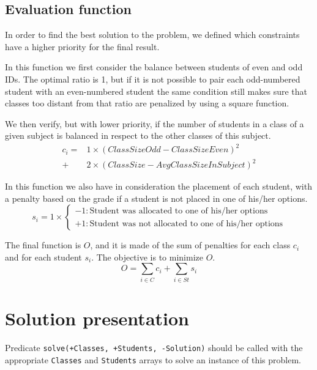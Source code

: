 \documentclass[runningheads]{llncs}
\begin{document}
\subsection{Evaluation function}

In order to find the best solution to the problem, we defined which constraints have a higher priority for the final result.

In this function we first consider the balance between students of even and odd IDs. The optimal ratio is 1, but if it is not possible to pair each odd-numbered student with an even-numbered student the same condition still makes sure that classes too distant from that ratio are penalized by using a square function. 

We then verify, but with lower priority, if the number of students in a class of a given subject is balanced in respect to the other classes of this subject.
\begin{equation}
\begin{aligned}
    c_i = & 1 \times \left(ClassSizeOdd - ClassSizeEven\right)^2 \\
        + & 2 \times \left(ClassSize - AvgClassSizeInSubject\right)^2
\end{aligned}
\end{equation}

In this function we also have in consideration the placement of each student, with a penalty based on the grade if a student is not placed in one of his/her options.
\begin{equation}
    s_i = 1 \times \begin{cases}
        -1 : \text{Student was allocated to one of his/her options} \\
        +1 : \text{Student was not allocated to one of his/her options}
    \end{cases}
\end{equation}

The final function is $O$, and it is made of the sum of penalties for each class $c_i$ and for each student $s_i$. The objective is to minimize $O$.
\begin{equation} 
    O = \sum_{i \in C}{c_i} + \sum_{i \in St}{s_i}
\end{equation}

\section{Solution presentation}

Predicate \texttt{solve(+Classes, +Students, -Solution)} should be called with the appropriate \texttt{Classes} and \texttt{Students} arrays to solve an instance of this problem.
\end{document}
